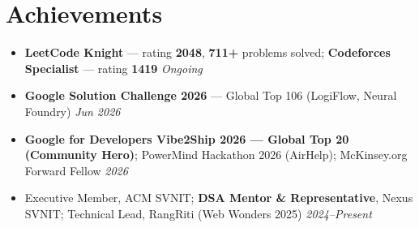 \documentclass[a4paper,10pt]{article}
\newcommand{\sectionContentSpace}{\vspace{2mm}}
\begin{document}
\section{Achievements}
\sectionContentSpace
\begin{itemize}[leftmargin=3ex, rightmargin=2ex, noitemsep, topsep=4pt, parsep=0pt, partopsep=0pt, labelsep=1.2mm, itemsep=2pt]\small
  \item \textbf{LeetCode Knight} --- rating \textbf{2048}, \textbf{711+} problems solved; \textbf{Codeforces Specialist} --- rating \textbf{1419} \hfill \textit{Ongoing}
  \item \textbf{Google Solution Challenge 2026} --- Global Top 106 (LogiFlow, Neural Foundry) \hfill \textit{Jun 2026}
  \item \textbf{Google for Developers Vibe2Ship 2026 — Global Top 20 (Community Hero)}; PowerMind Hackathon 2026 (AirHelp); McKinsey.org Forward Fellow \hfill \textit{2026}
  \item Executive Member, ACM SVNIT; \textbf{DSA Mentor \& Representative}, Nexus SVNIT; Technical Lead, RangRiti (Web Wonders 2025) \hfill \textit{2024--Present}
\end{itemize}
\end{document}
